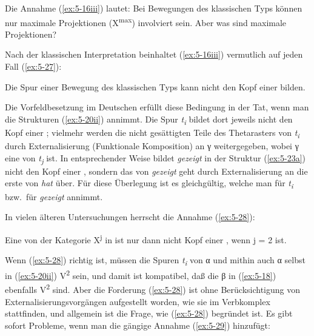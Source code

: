 \documentclass[output=paper]{LSP/langsci}
\begin{document}
\ssubsection{}%
\label{subsec:5-2-3}
Die Annahme (\ref{ex:5-16iii}) lautet: Bei Bewegungen des klassischen Typs können nur maximale Projektionen (X\textsuperscript{max}) involviert sein. Aber was sind maximale Projektionen?

Nach der klassischen Interpretation beinhaltet (\ref{ex:5-16iii}) vermutlich auf jeden Fall (\ref{ex:5-27}):

\begin{exe}
\ex%
\label{ex:5-27}
Die Spur einer Bewegung des klassischen Typs kann nicht den Kopf einer  bilden.
\end{exe}
Die Vorfeldbesetzung im Deutschen erfüllt diese Bedingung in der Tat, wenn man die Strukturen (\ref{ex:5-20ii}) annimmt. Die Spur \textit{t\textsubscript{i}} bildet dort jeweils nicht den Kopf einer ; vielmehr werden die nicht gesättigten Teile des Thetarasters von \textit{t\textsubscript{i}} durch Externalisierung (Funktionale Komposition) an γ weitergegeben, wobei γ eine  von \textit{t\textsubscript{j}} ist. In entsprechender Weise bildet \textit{gezeigt }in der Struktur (\ref{ex:5-23a}) nicht den Kopf einer , sondern das  von \textit{gezeigt} geht durch Externalisierung an die erste  von \textit{hat} über. Für diese Überlegung ist es gleichgültig, welche  man für \textit{t\textsubscript{i}} bzw.\ für \textit{gezeigt} annimmt. 

\pagebreak
In vielen älteren Untersuchungen herrscht die Annahme (\ref{ex:5-28}):
\begin{exe}
\ex%
\label{ex:5-28}
Eine  von der Kategorie X\textsuperscript{j} in  ist nur dann nicht Kopf einer , wenn j = 2 ist.
\end{exe}
Wenn (\ref{ex:5-28}) richtig ist, müssen die Spuren \textit{t\textsubscript{i}} von α und mithin auch α selbst in (\ref{ex:5-20ii}) V\textsuperscript{2} sein, und damit ist kompatibel, daß die β in (\ref{ex:5-18}) ebenfalls V\textsuperscript{2} sind. Aber die Forderung (\ref{ex:5-28}) ist ohne Berücksichtigung von Externalisierungsvorgängen aufgestellt worden, wie sie im Verbkomplex stattfinden, und allgemein ist die Frage, wie (\ref{ex:5-28}) begründet ist. Es gibt sofort Probleme, wenn man die gängige Annahme (\ref{ex:5-29}) hinzufügt:
\end{document}
